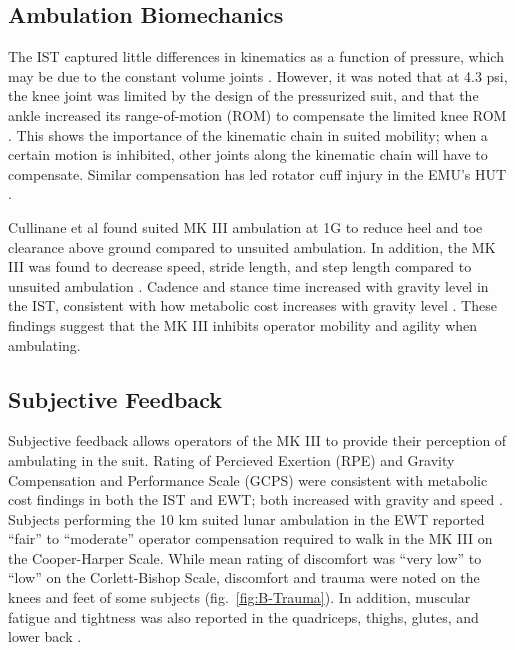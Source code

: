 \documentclass[defaultstyle,11pt]{comps}
\begin{document}
\hypertarget{ambulation-biomechanics}{%
\subsection{Ambulation Biomechanics}\label{ambulation-biomechanics}}

The IST captured little differences in kinematics as a function of pressure, which may be due to the constant volume joints \citep{Norcross2010}.
However, it was noted that at 4.3 psi, the knee joint was limited by the design of the pressurized suit, and that the ankle increased its range-of-motion (ROM) to compensate the limited knee ROM \citep{Norcross2010}.
This shows the importance of the kinematic chain in suited mobility; when a certain motion is inhibited, other joints along the kinematic chain will have to compensate.
Similar compensation has led rotator cuff injury in the EMU's HUT \citep{Williams2003}.

Cullinane et al \citep{Cullinane2017a} found suited MK III ambulation at 1G to reduce heel and toe clearance above ground compared to unsuited ambulation.
In addition, the MK III was found to decrease speed, stride length, and step length compared to unsuited ambulation \citep{Cullinane2017a}.
Cadence and stance time increased with gravity level in the IST, consistent with how metabolic cost increases with gravity level \citep{Norcross2010}.
These findings suggest that the MK III inhibits operator mobility and agility when ambulating.

\hypertarget{subjective-feedback}{%
\subsection{Subjective Feedback}\label{subjective-feedback}}

Subjective feedback allows operators of the MK III to provide their perception of ambulating in the suit.
Rating of Percieved Exertion (RPE) and Gravity Compensation and Performance Scale (GCPS) were consistent with metabolic cost findings in both the IST and EWT; both increased with gravity and speed \citep{Norcross2009, Norcross2010}.
Subjects performing the 10 km suited lunar ambulation in the EWT reported ``fair'' to ``moderate'' operator compensation required to walk in the MK III on the Cooper-Harper Scale\citep{Norcross2009}.
While mean rating of discomfort was ``very low'' to ``low'' on the Corlett-Bishop Scale, discomfort and trauma were noted on the knees and feet of some subjects \citep{Norcross2009} (fig.~\ref{fig:B-Trauma}).
In addition, muscular fatigue and tightness was also reported in the quadriceps, thighs, glutes, and lower back \citep{Norcross2009}.
\end{document}
